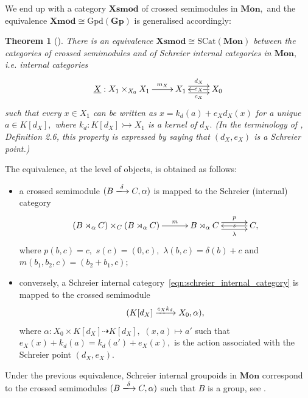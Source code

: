 \documentclass[a4paper]{amsart}
\theoremstyle{plain}
\newtheorem{theorem}[subsection]{Theorem}
\theoremstyle{definition}
\theoremstyle{remark}
\begin{document}
We end up with a category $\mathbf{Xsmod}$ of crossed semimodules in $\mathbf{Mon},$ and the equivalence $\mathbf{Xmod}\cong \mathrm{Gpd}(\mathbf{Gp})$ is generalised accordingly:
\begin{theorem}[\cite{P-semi}]
\label{thm:equivalence_crossed_semimodules_schreier_categories}
There is an equivalence $\mathbf{Xsmod}\cong\mathrm{SCat}(\mathbf{Mon})$ between the categories of crossed semimodules and of Schreier internal categories in $\mathbf{Mon},$ i.e. internal categories
\begin{equation}
\label{eqn:schreier_internal_category}
\xymatrix{{\underline{X}: X_1\times_{X_0}X_1} \ar[r]^-{m_X} &{X_1} \ar@<.9ex>[r]^-{d_X} \ar@<-.9ex>[r]_-{c_X} &{X_0} \ar[l]|{e_X} }
\end{equation}
such that every $x\in X_1$ can be written as $x=k_d(a)+e_Xd_X(x)$ for a unique $a\in K[d_X],$ where $k_d\colon K[d_X]\rightarrowtail X_1$ is a kernel of $d_X.$ (In the terminology of \cite{MMS}, Definition 2.6, this property is expressed by saying that $(d_X,e_X)$ is a \emph{Schreier point}.)
\end{theorem}
The equivalence, at the level of objects, is obtained as follows:
\begin{itemize}
\item a crossed semimodule $(B\xlongrightarrow{\delta} C,\alpha)$ is mapped to the Schreier (internal) category
\begin{equation*}
\xymatrixcolsep{2.5pc}
\xymatrix{{(B\rtimes_{\alpha} C)\times_C (B\rtimes_{\alpha} C)} \ar[r]^-m &{B\rtimes_{\alpha} C} \ar@<.9ex>[r]^-{p} \ar@<-.9ex>[r]_-{\lambda} &{C,} \ar[l]|-s}
\end{equation*}
where $p(b,c)=c,$ $s(c)=(0,c),$ $\lambda(b,c)=\delta(b)+c$ and $m(b_1,b_2,c)=(b_2+b_1,c);$
\item conversely, a Schreier internal category~\eqref{eqn:schreier_internal_category} is mapped to the crossed semimodule
\begin{equation*}
(K[d_X]\xlongrightarrow{c_Xk_d} X_0,\alpha),
\end{equation*}
where $\alpha\colon X_0\times K[d_X]\dashrightarrow K[d_X],$ $(x,a)\mapsto a'$ such that $e_X(x)+k_d(a)=k_d(a')+e_X(x),$ is the action associated with the Schreier point $(d_X,e_X).$
\end{itemize}

Under the previous equivalence, Schreier internal groupoids in $\mathbf{Mon}$ correspond to the crossed semimodules $(B\xlongrightarrow{\delta} C,\alpha)$ such that $B$ is a group, see \cite{MMS}.
\end{document}
